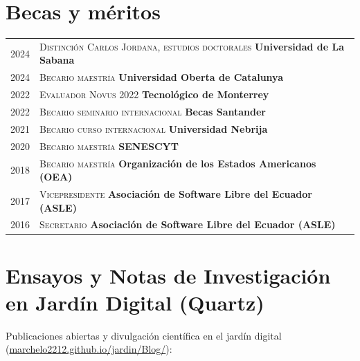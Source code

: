 \documentclass[a4paper]{article}
\begin{document}
\section{Becas y méritos}
\begin{longtable}{rl}
\textsc{2024}  & \textsc{Distinción Carlos Jordana, estudios doctorales} \textbf{Universidad de La Sabana} \\
\textsc{2024}  & \textsc{Becario maestría} \textbf{Universidad Oberta de Catalunya} \\
\textsc{2022}  & \textsc{Evaluador Novus 2022} \textbf{Tecnológico de Monterrey} \\
\textsc{2022}  & \textsc{Becario seminario internacional } \textbf{Becas Santander} \\
\textsc{2021}  & \textsc{Becario curso internacional} \textbf{Universidad Nebrija} \\
\textsc{2020}  & \textsc{Becario maestría} \textbf{SENESCYT} \\
\textsc{2018}  & \textsc{Becario maestría} \textbf{Organización de los Estados Americanos (OEA)} \\

\textsc{2017}  & \textsc{Vicepresidente } \textbf{Asociación de Software Libre del Ecuador (ASLE)} \\

\textsc{2016}  & \textsc{Secretario} \textbf{Asociación de Software Libre del Ecuador (ASLE)} \\

\end{longtable}

\nocite{*}
\printbibliography[title={Publicaciones Académicas}]

\section{Ensayos y Notas de Investigación en Jardín Digital (Quartz)}
\begin{flushleft}
Publicaciones abiertas y divulgación científica en el jardín digital (\href{https://marchelo2212.github.io/jardin/Blog/}{marchelo2212.github.io/jardin/Blog/}):
\end{flushleft}
\end{document}
